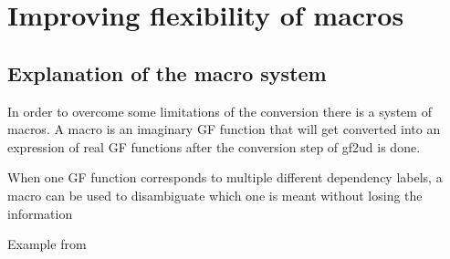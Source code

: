 \chapter{Improving flexibility of macros}
\label{improving-flexibility-macros}




\section{Explanation of the macro system}


In order to overcome some limitations  of the conversion there is a system of macros. A macro is an imaginary GF function that will get converted into an expression of real GF functions after the conversion step of gf2ud is done.


When one GF function corresponds to multiple different dependency labels, a macro can be used to disambiguate which one is meant without losing the information

Example from \cite{kolachina-ranta-2017}



